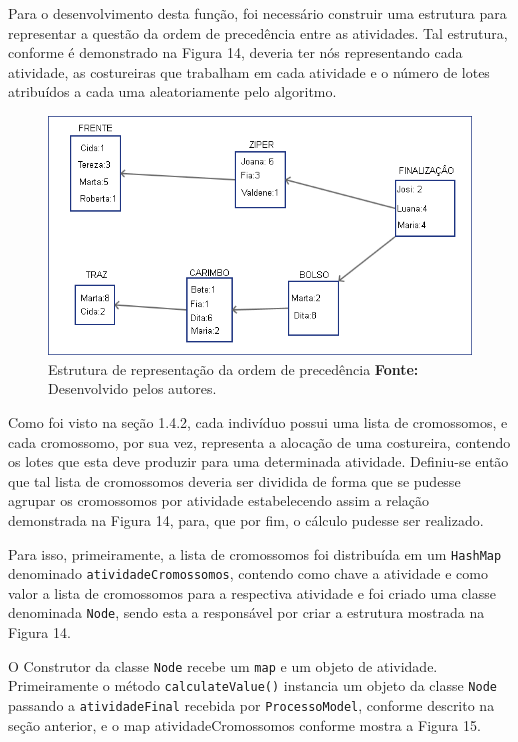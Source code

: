 \par Para o desenvolvimento desta função, foi necessário construir uma estrutura para representar a questão da ordem de 
precedência entre as atividades. Tal estrutura, conforme é demonstrado na Figura
14, deveria ter nós representando cada atividade, as costureiras que trabalham em cada atividade e o número de lotes atribuídos a cada uma aleatoriamente pelo algoritmo.

\newpage

\begin{figure}[h!]
	\centerline{\includegraphics[scale=0.6]{./imagens/montagem_node.png}}
	\caption[Distribuição de trabalho]
	{Estrutura de representação da ordem de precedência \textbf{Fonte:}
	Desenvolvido pelos autores.}
	\label{fig:exemplo1}
\end{figure}


\par Como foi visto na seção 1.4.2, cada indivíduo possui uma lista de
cromossomos, e cada cromossomo, por sua vez, representa a alocação de uma
costureira, contendo os lotes que esta deve produzir para uma determinada atividade. 
Definiu-se então que tal lista de cromossomos deveria ser dividida de forma que se pudesse 
agrupar os cromossomos por atividade estabelecendo assim
a relação demonstrada na Figura 14, para, que por fim, o cálculo pudesse ser
realizado.

\par Para isso, primeiramente, a lista de cromossomos foi distribuída em um \texttt{HashMap} denominado 
\texttt{atividadeCromossomos}, contendo como chave a atividade e como valor a lista de cromossomos para a 
respectiva atividade e foi criado uma classe denominada \texttt{Node}, sendo
esta a responsável por criar a estrutura mostrada na Figura 14.

\par O Construtor da classe \texttt{Node} recebe um \texttt{map} e um objeto de
atividade. Primeiramente o método \texttt{calculateValue()} instancia um objeto da classe \texttt{Node} passando 
a \texttt{atividadeFinal} recebida por \texttt{ProcessoModel}, conforme descrito
na seção anterior, e o map atividadeCromossomos conforme mostra a Figura 15.

